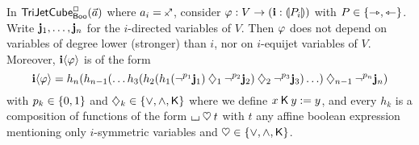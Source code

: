 \documentclass[a4paper]{memoir}
\begin{document}
\begin{lemma} \label{thm:char-jet-cube-to-line}
	In $\mathsf{TriJetCube}^{\Box}_{\mathsf{Boo}}\mathopen{}\left( \vec a \right)\mathclose{}$ where $a_i = \ypolar$, consider $\varphi : V \to (\mathbf{i} : {\llparenthesis P_i \rrparenthesis})$ with $P \in \mathopen{}\left\{ \rightarrowtriangle, \leftarrowtriangle \right\}\mathclose{}$.
	Write $\mathbf{j}_1, \ldots, \mathbf{j}_n$ for the $i$-directed variables of $V$.
	Then $\varphi$ does not depend on variables of degree lower (stronger) than $i$, nor on $i$-equijet variables of $V$.
	Moreover, $\mathbf{i} \langle \varphi \rangle$ is of the form
	\[
		\mathbf{i} \langle \varphi \rangle = h_n(h_{n-1}(\ldots h_3(h_2(h_1(\lnot^{p_1} \mathbf{j}_1) \mathbin{\diamondsuit}_1 \lnot^{p_2} \mathbf{j}_2) \mathbin{\diamondsuit}_2 \lnot^{p_3} \mathbf{j}_3) \ldots ) \mathbin{\diamondsuit}_{n-1} \lnot^{p_n} \mathbf{j}_n)
	\]
	with $p_k \in \mathopen{}\left\{ 0, 1 \right\}\mathclose{}$ and $\mathbin{\diamondsuit}_k \in \mathopen{}\left\{ {\vee}, {\wedge}, {\mathbin{\mathsf{K}}} \right\}\mathclose{}$ where we define $x \mathbin{\mathsf{K}} y := y$, and every $h_k$ is a composition of functions of the form ${\llcorner\hspace{-.4ex}\lrcorner} \mathbin{\heartsuit} t$ with $t$ any affine boolean expression mentioning only $i$-symmetric variables and ${\mathbin{\heartsuit}} \in \mathopen{}\left\{ {\vee}, {\wedge}, {\mathbin{\mathsf{K}}} \right\}\mathclose{}$.
\end{lemma}
\end{document}
